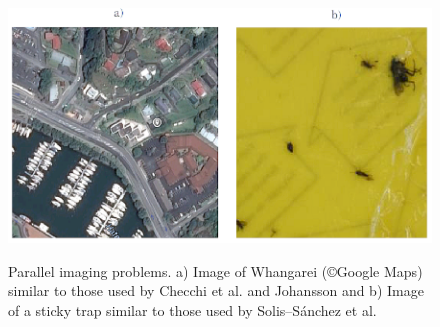 \begin{figure}[!htbp]
\myfloatalign
{\includegraphics[width=.95\linewidth]{gfx2/sat_boat}} \\ 
\caption [Parallel imaging problems.]{Parallel imaging problems. a) Image of Whangarei (\copyright Google Maps) similar to those used by Checchi et al. \cite{Checchi2013} and Johansson \cite{Johansson2011} and b) Image of a sticky trap similar to those used by Solis--S{\'a}nchez et al. \cite{Solis2009} }\label{fig:sat_boat}
\end{figure}
\clearpage

